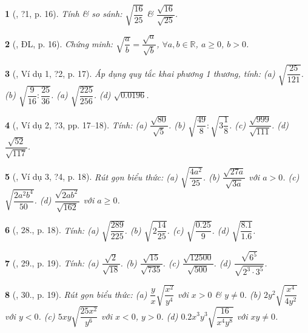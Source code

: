 \documentclass{article}
\newtheorem{baitoan}{}%
\begin{document}
\begin{baitoan}[\cite{SGK_Toan_9_tap_1}, ?1, p. 16]
	Tính \& so sánh: $\sqrt{\dfrac{16}{25}}$ \& $\dfrac{\sqrt{16}}{\sqrt{25}}$.
\end{baitoan}

\begin{baitoan}[\cite{SGK_Toan_9_tap_1}, ĐL, p. 16]
	Chứng minh: $\sqrt{\dfrac{a}{b}} = \dfrac{\sqrt{a}}{\sqrt{b}}$, $\forall a,b\in\mathbb{R}$, $a\ge0$, $b > 0$.
\end{baitoan}

\begin{baitoan}[\cite{SGK_Toan_9_tap_1}, Ví dụ 1, ?2, p. 17]
	Áp dụng quy tắc khai phương 1 thương, tính: (a) $\sqrt{\dfrac{25}{121}}$. (b) $\sqrt{\dfrac{9}{16}:\dfrac{25}{36}}$. (a) $\sqrt{\dfrac{225}{256}}$. (d) $\sqrt{0.0196}$.
\end{baitoan}

\begin{baitoan}[\cite{SGK_Toan_9_tap_1}, Ví dụ 2, ?3, pp. 17--18]
	Tính: (a) $\dfrac{\sqrt{80}}{\sqrt{5}}$. (b) $\sqrt{\dfrac{49}{8}}:\sqrt{3\dfrac{1}{8}}$. (c) $\dfrac{\sqrt{999}}{\sqrt{111}}$. (d) $\dfrac{\sqrt{52}}{\sqrt{117}}$.
\end{baitoan}

\begin{baitoan}[\cite{SGK_Toan_9_tap_1}, Ví dụ 3, ?4, p. 18]
	Rút gọn biểu thức: (a) $\sqrt{\dfrac{4a^2}{25}}$. (b) $\dfrac{\sqrt{27a}}{\sqrt{3a}}$ với $a > 0$. (c) $\sqrt{\dfrac{2a^2b^4}{50}}$. (d) $\dfrac{\sqrt{2ab^2}}{\sqrt{162}}$ với $a\ge0$.
\end{baitoan}

\begin{baitoan}[\cite{SGK_Toan_9_tap_1}, 28., p. 18]
	Tính: (a) $\sqrt{\dfrac{289}{225}}$. (b) $\sqrt{2\dfrac{14}{25}}$. (c) $\sqrt{\dfrac{0.25}{9}}$. (d) $\sqrt{\dfrac{8.1}{1.6}}$.
\end{baitoan}

\begin{baitoan}[\cite{SGK_Toan_9_tap_1}, 29., p. 19]
	Tính: (a) $\dfrac{\sqrt{2}}{\sqrt{18}}$. (b) $\dfrac{\sqrt{15}}{\sqrt{735}}$. (c) $\dfrac{\sqrt{12500}}{\sqrt{500}}$. (d) $\dfrac{\sqrt{6^5}}{\sqrt{2^3\cdot3^5}}$.
\end{baitoan}

\begin{baitoan}[\cite{SGK_Toan_9_tap_1}, 30., p. 19]
	Rút gọn biểu thức: (a) $\dfrac{y}{x}\sqrt{\dfrac{x^2}{y^4}}$ với $x > 0$ \& $y\ne0$. (b) $2y^2\sqrt{\dfrac{x^4}{4y^2}}$ với $y < 0$. (c) $5xy\sqrt{\dfrac{25x^2}{y^6}}$ với $x < 0$, $y > 0$. (d) $0.2x^3y^3\sqrt{\dfrac{16}{x^4y^8}}$ với $xy\ne0$.
\end{baitoan}
\end{document}
